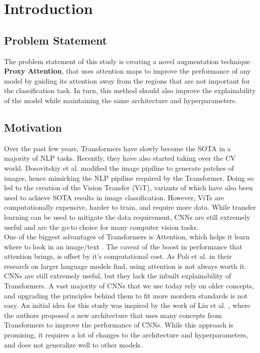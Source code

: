 
\chapter{Introduction}

\section{Problem Statement}
The problem statement of this study is creating a novel augmentation technique \textbf{Proxy Attention}, that uses attention maps to improve the performance of any model by guiding its attention away from the regions that are not important for the classification task.
In turn, this method should also improve the explainability of the model while maintaining the same architecture and hyperparameters.

\section{Motivation}
Over the past few years, Transformers have slowly become the SOTA in a majority of NLP tasks. Recently, they have also started taking over the CV world. Dosovitskiy et al. \cite{dosovitskiyImageWorth16x162021}  modified the image pipiline to generate patches of images, hence mimicking the NLP pipiline required by the Transformer. Doing so led to the creation of the Vision Transfer (ViT), variants of which have also been used to achieve SOTA results in image classification. However, ViTs are computationally expensive, harder to train, and require more data. While transfer learning can be used to mitigate the data requirement, CNNs are still extremely useful and are the go-to choice for many computer vision tasks.\\
One of the biggest advantages of Transformers is Attention, which helps it learn where to look in an image/text \cite{vaswaniAttentionAllYou2017}. The caveat of the boost in performance that attention brings, is offset by it's computational cost. As Poli et al. \cite{poliHyenaHierarchyLarger2023} in their research on larger language models find, using attention is not always worth it. CNNs are still extremely useful, but they lack the inbuilt explainability of Transformers. A vast majority of CNNs that we use today rely on older concepts, and upgrading the principles behind them to fit more mordern standards is not easy. An initial idea for this study was inspired by the work of Liu et al. \cite{liuConvNet2020s2022}, where the authors proposed a new architecture that uses many concepts from Transformers to improve the performance of CNNs. While this approach is promising, it requires a lot of changes to the architecture and hyperparameters, and does not generalize well to other models. \\ 
